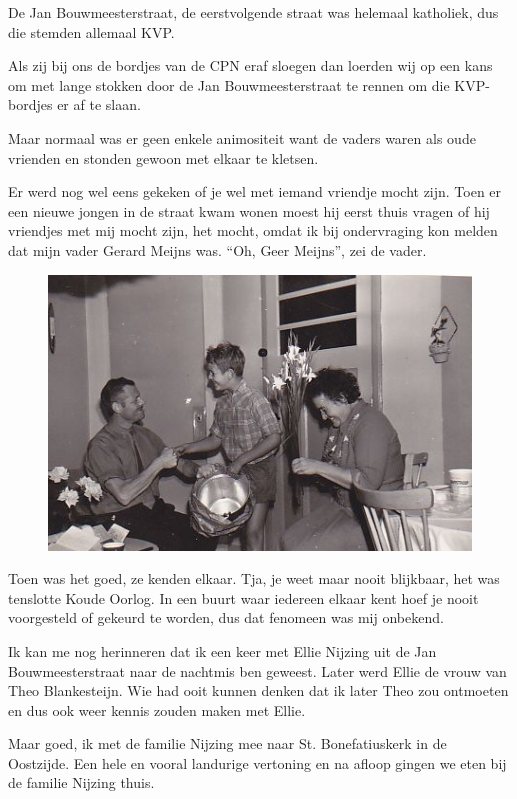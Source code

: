 \documentclass[12pt,twoside, openright]{memoir}
\begin{document}
De Jan Bouwmeesterstraat, de eerstvolgende straat was helemaal katholiek, dus die stemden allemaal KVP. 

Als zij bij ons de bordjes van de CPN eraf sloegen dan loerden wij op een kans om met lange stokken door de Jan Bouwmeesterstraat te rennen om die KVP-bordjes er af te slaan.

Maar normaal was er geen enkele animositeit want de vaders waren als oude vrienden en stonden gewoon met elkaar te kletsen. 

Er werd nog wel eens gekeken of je wel met iemand vriendje mocht zijn. Toen er een nieuwe jongen in de straat kwam wonen moest hij eerst thuis vragen of hij vriendjes met mij mocht zijn, het mocht, omdat ik bij ondervraging kon melden dat mijn vader Gerard Meijns was. “Oh, Geer Meijns”, zei de vader. 

\begin{figure}
\includegraphics[width=\textwidth]{img/ch5/vanharte}
\caption*{\footnotesize }
\end{figure} 

Toen was het goed, ze kenden elkaar. Tja, je weet maar nooit blijkbaar, het was tenslotte Koude Oorlog. In een buurt waar iedereen elkaar kent hoef je nooit voorgesteld of gekeurd te worden, dus dat fenomeen was mij onbekend.

Ik kan me nog herinneren dat ik een keer met Ellie Nijzing uit de Jan Bouwmeesterstraat naar de nachtmis ben geweest. Later werd Ellie de vrouw van Theo Blankesteijn. Wie had ooit kunnen denken dat ik later Theo zou ontmoeten en dus ook weer kennis zouden maken met Ellie. 

Maar goed, ik met de familie Nijzing mee naar St. Bonefatiuskerk in de Oostzijde. Een hele en vooral landurige vertoning en na afloop gingen we eten bij de familie Nijzing thuis. 
\end{document}
